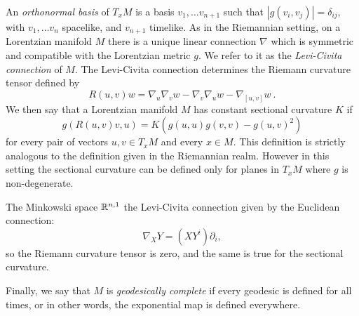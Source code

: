 \documentclass{report}
\begin{document}
An \emph{orthonormal basis} of $T_xM$ is a basis $v_1,\ldots v_{n+1}$ such that $|g(v_i, v_j)|=\delta_{ij}$, with $v_1,\ldots v_n$ spacelike, and  $v_{n+1}$ timelike.
As in the Riemannian setting, on a Lorentzian manifold $M$ there is a unique linear connection $\nabla$ which is symmetric and compatible with the Lorentzian metric $g$.
We refer to it as the \emph{Levi-Civita connection} of $M$. The Levi-Civita connection determines the Riemann curvature tensor  defined by
$$R(u,v)w=\nabla_u \nabla_v w-\nabla_v \nabla_u w-\nabla_{[u,v]}w~.$$
We then say that a Lorentzian manifold $M$ has constant sectional curvature $K$ if
\begin{equation}\label{eq:constcurv}
     g(R(u,v)v,u)=K \left(g(u,u)g(v,v)-g(u,v)^2\right)
\end{equation}
for every pair of vectors $u,v\in T_xM$ and every $x\in M$.
This definition is strictly analogous to the definition given in the Riemannian realm. However in this setting the sectional curvature can be defined only for planes in 
$T_x M$ where $g$ is non-degenerate.
\begin{example}
The Minkowski space $\mathbb{R}^{n,1}$ the Levi-Civita connection given by the Euclidean connection:
\[
\nabla_X Y = (X Y^i)\partial_i,
\]
so the Riemann curvature tensor is zero, and the same is true for the sectional curvature.
\end{example}

Finally, we say that $M$ is \emph{geodesically complete} if every geodesic is defined for all times, or in other words, the exponential map is defined everywhere.
\end{document}
